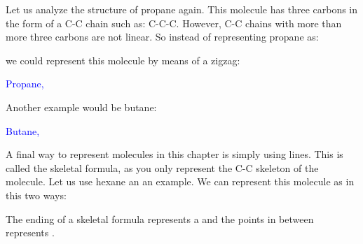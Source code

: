 \documentclass[main.tex]{subfiles}
\begin{document}
\begin{description}
\begin{example}
\begin{flushright}
 \end{flushright}

\end{example}%






\item[\docfilehook{\smallpencil ZigZag}{ZigZag}] Let us analyze the structure of propane again. This molecule has three carbons in the form of a C-C chain such as: C-C-C. However, C-C chains with more than more three carbons are not linear. So instead of representing propane as:
\begin{center} \end{center}
we could represent this molecule by means of a zigzag:

\begin{center} \hspace{0.5cm}\textcolor{blue}{Propane, }\end{center}
Another example would be butane:
\begin{center} \hspace{0.5cm}\textcolor{blue}{Butane, }\end{center}

\item[\docfilehook{\smallpencil Skeletal formula}{Skeletal formula}] A final way to represent molecules in this chapter is simply using lines. This is called the skeletal formula, as you only represent the C-C skeleton of the molecule. Let us use hexane an an example. We can represent this molecule as in this two ways:
\begin{center}\end{center}
The ending of a skeletal formula represents a  and the points in between represents . 


\end{description}
\end{document}
